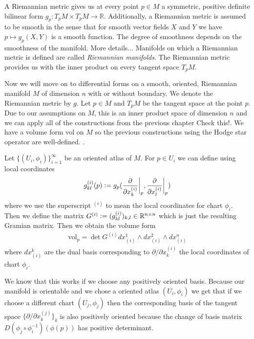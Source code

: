 \documentclass[12pt,a4paper]{article}
\numberwithin{equation}{subsection}
\numberwithin{lemma}{subsection}
\theoremstyle{definition}
\newcommand{\real}{\mathbb{R}}
\begin{document}
A Riemannian metric gives us at every point $p \in M$ 
a symmetric, positive definite bilinear form 
$g_p: T_p M \times T_p M \rightarrow \real$. Additionally, a Riemannian metric 
is assumed to be smooth in the sense that for smooth vector fields 
$X$ and $Y$ we have $p \mapsto g_p(X,Y)$ is a smooth function. The degree 
of smoothness depends on the smoothness of the manifold. 
{\color{red} More details... }
Manifolds on which a Riemannian metric is defined are called 
\textit{Riemannian manifolds}. The Riemannian metric provides us with the 
inner product on every tangent space $T_p M$. 

Now we will move on to differential forms on a smooth, oriented, Riemannian 
manifold $M$ of dimension $n$ 
with or without boundary. We denote the Riemannian metric by $g$.
Let $p \in M$ and $T_p M$ be the tangent space at the point $p$. 
Due to our assumptions on $M$, this is an inner product space of 
dimension $n$ and we can apply 
all of the constructions from the previous chapter
{\color{red} Check this!}. We have a volume form vol on $M$ so the 
previous constructions using the Hodge star operator are well-defined.  
\cite[2.7]{riemannian_geometry}. 

Let $\{(U_i,\phi_i)\}_{i=1}^\infty$ be an oriented atlas of $M$.
For $p \in U_i$ we can define using local coordinates
\begin{align*}
    g_{kl}^{(i)}(p) \vcentcolon= g_p(\frac{\partial}{\partial x^{(i)}_k}\bigg|_p, 
        \frac{\partial}{\partial x^{(i)}_l}\bigg|_p) 
\end{align*}
where we use the superscript $^{(i)}$ to mean the local coordinates for 
chart $\phi_i$.
Then we define the matrix $G^{(i)} \vcentcolon= 
(g_{kl}^{(i)})_{k,l} \in \real^{n \times n}$ which is just the resulting Gramian 
matrix. 
Then we obtain the volume form 
\begin{align*}
    \text{vol}_p = \det G^{(i)} 
    dx_{(i)}^1 \wedge dx_{(i)}^2 \wedge dx_{(i)}^n
\end{align*}
where $dx_{(i)}^k$ are the dual basis corresponding to 
$\partial/\partial x^{(i)}_k$ the local coordinates 
of chart $\phi_i$. 

We know that this works if we choose any positively oriented basis. 
Because our manifold is orientable and we chose a oriented atlas 
$(U_i,\phi_i)$ we get that if we choose a different chart $(U_j,\phi_j)$ 
then the 
corresponding basis of the tangent space
$\{ \partial / \partial x^{(j)}_k \}_k$ is also positively oriented because
the change of basis matrix $D(\phi_j \circ \phi_i^{-1})(\phi(p))$ has positive
determinant.
\end{document}
